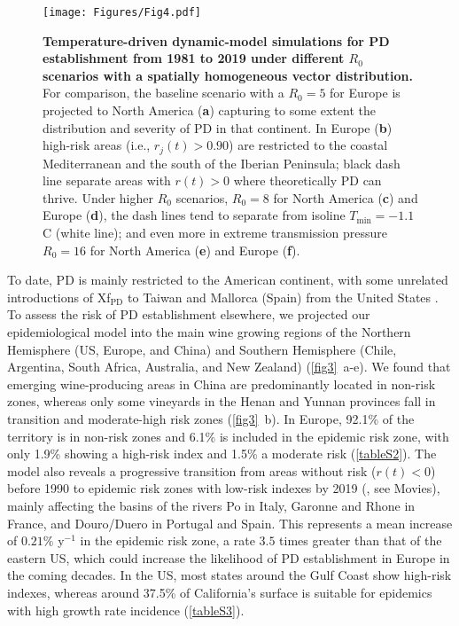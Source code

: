     \begin{figure}[b!]
        \centering
        \texttt{[image: Figures/Fig4.pdf]}
        \caption[Temperature-driven model simulations for PD
            establishment from 1981 to 2019]{\textbf{Temperature-driven
                dynamic-model simulations
                for PD
                establishment from 1981 to 2019 under different $R_0$ scenarios
                with a
                spatially homogeneous vector distribution.} For comparison, the
            baseline
            scenario with a $R_0=5$ for Europe is projected to North America
            (\textbf{a})
            capturing to some extent the distribution and severity of PD in
            that continent.
            In Europe (\textbf{b}) high-risk areas (i.e., $r_j(t) > 0.90$) are
            restricted
            to the coastal Mediterranean and the south of the Iberian
            Peninsula; black dash
            line separate areas with $r(t)>0$ where theoretically PD can
            thrive. Under
            higher $R_0$ scenarios, $R_0=8$ for North America (\textbf{c}) and
            Europe
            (\textbf{d}), the dash lines tend to separate from isoline
            $T_{\textrm{min}} =
                -1.1$\textdegree C (white line); and even more in extreme
            transmission pressure
            $R_0=16$ for North America (\textbf{e}) and Europe (\textbf{f}). }
        \label{fig4}
    \end{figure}

    To date, PD is mainly restricted to the American continent, with some
    unrelated introductions of Xf$_{\textrm{PD}}$ to Taiwan and Mallorca
    (Spain) from the United States \cite{Moralejo2019,Su2013}. To assess the
    risk of PD establishment elsewhere, we projected our epidemiological model
    into the main wine growing regions of the Northern Hemisphere (US, Europe,
    and China) and Southern Hemisphere (Chile, Argentina, South Africa,
    Australia, and New Zealand) (\cref{fig3}~\textcolor{ref_color}{a-e}). We
    found that emerging
    wine-producing areas in China are predominantly located in non-risk zones,
    whereas only some vineyards in the Henan and Yunnan provinces fall in
    transition and moderate-high risk zones
    (\cref{fig3}~\textcolor{ref_color}{b}). In Europe, 92.1\%
    of the territory is in non-risk zones and 6.1\% is included in the
    epidemic risk zone, with only 1.9\% showing a high-risk index and 1.5\% a
    moderate risk (\cref{tableS2}). The model also reveals a progressive
    transition from areas without risk ($r(t) < 0$) before 1990 to
    epidemic risk zones with low-risk indexes by 2019 (\cite{Webpage}, see
    Movies), mainly affecting the basins of the rivers Po in Italy, Garonne and
    Rhone in France, and Douro/Duero in Portugal and Spain. This represents a
    mean increase of $0.21\%$ y$^{-1}$ in the epidemic risk zone, a rate $3.5$
    times greater than that of the eastern US, which could increase the
    likelihood of PD establishment in Europe in the coming decades. In the US,
    most states around the Gulf Coast show high-risk indexes, whereas around
    37.5\% of California's surface is suitable for epidemics with high growth
    rate incidence (\cref{tableS3}).

